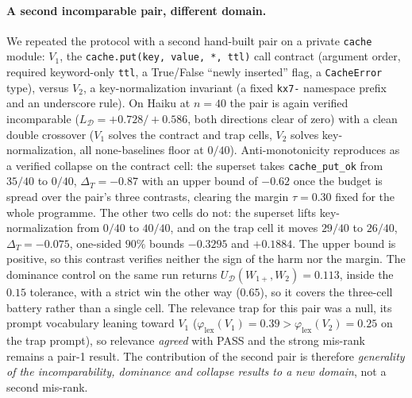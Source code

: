 \documentclass[11pt]{article}
\theoremstyle{plain}
\theoremstyle{definition}
\theoremstyle{remark}
\newcommand{\Dcal}{\mathcal{D}}
\begin{document}
\paragraph{A second incomparable pair, different domain.}
We repeated the protocol with a second hand-built pair on a private \texttt{cache} module: $V_1$, the
\texttt{cache.put(key, value, *, ttl)} call contract (argument order, required keyword-only
\texttt{ttl}, a True/False ``newly inserted'' flag, a \texttt{CacheError} type), versus $V_2$, a
key-normalization invariant (a fixed \texttt{kx7-} namespace prefix and an underscore rule). On Haiku
at $n=40$ the pair is again verified incomparable ($L_{\Dcal} = +0.728 / +0.586$, both directions clear
of zero) with a clean double crossover ($V_1$ solves the contract and trap cells, $V_2$ solves
key-normalization, all none-baselines floor at $0/40$). Anti-monotonicity reproduces as a verified
collapse on the contract cell: the superset takes \texttt{cache\_put\_ok} from $35/40$ to $0/40$,
$\Delta_T=-0.87$ with an upper bound of $-0.62$ once the budget is spread over the pair's three
contrasts, clearing the margin $\tau=0.30$ fixed for the whole programme. The other two cells do
not: the superset lifts key-normalization from $0/40$ to $40/40$, and on the trap cell it moves
$29/40$ to $26/40$, $\Delta_T=-0.075$, one-sided $90\%$ bounds $-0.3295$ and $+0.1884$. The upper
bound is positive, so this contrast verifies neither the sign of the harm nor the margin. The
dominance control on the same run returns $U_{\Dcal}(W_{1+},W_2)=0.113$, inside the $0.15$
tolerance, with a strict win the other way ($0.65$), so it covers the three-cell battery rather
than a single cell. The relevance trap for this pair was a null, its prompt vocabulary leaning
toward $V_1$ ($\varphi_{\mathrm{lex}}(V_1)=0.39 > \varphi_{\mathrm{lex}}(V_2)=0.25$ on the trap
prompt), so relevance \emph{agreed} with PASS and
the strong mis-rank remains a pair-1 result. The contribution of the second pair is therefore
\emph{generality of the incomparability, dominance and collapse results to a new domain}, not a
second mis-rank.
\end{document}
